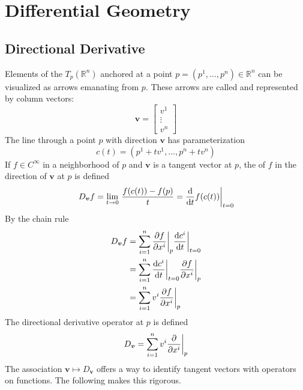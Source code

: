 


\newcommand{\gln}{\operatorname{GL}(n, \R)}
\newcommand{\Rnn}{\R^{n \times n}}
\section{Differential Geometry}\label{sec:dg}
\localtableofcontents

\subsection{Directional Derivative}

Elements of the  \(T_p (\mathbb{R}^n)\) anchored at a point \(p = (p^1, \dots, p^n) \in \mathbb{R}^n\) can be visualized as arrows emanating from \(p\).
%
These arrows are called  and represented by column vectors:
%
\begin{equation}
    \bm{v}
    =
    \begin{bmatrix}
        v^1 \\ \vdots \\ v^n
    \end{bmatrix}
\end{equation}
%
The line through a point \(p\) with direction \(\bm{v}\) has parameterization
%
\begin{equation}
    c(t) = \left( p^1 + t v^1, \dots, p^n + t v^n \right)
\end{equation}
%
If \(f \in C^\infty\) in a neighborhood of \(p\) and \(\bm{v}\) is a tangent vector at \(p\), the  of \(f\) in the direction of \(\bm{v}\) at \(p\) is defined
%
\begin{equation}
    D_{\bm{v}} f
    =
    \lim_{t\rightarrow 0}\, \frac{f(c(t)) - f(p)}{t}
    =
    \evalat[\bigg]{\dv{}{t} f(c(t))}{t=0}
\end{equation}
%
By the chain rule
%
\begin{align}
    D_{\bm{v}} f & = \sum_{i=1}^{n} \evalat[\bigg]{\pdv{f}{x^i}}{p} \evalat[\bigg]{\dv{c^i}{t}}{t=0} \\
                 & = \sum_{i=1}^{n} \evalat[\bigg]{\dv{c^i}{t}}{t=0} \evalat[\bigg]{\pdv{f}{x^i}}{p} \\
                 & = \sum_{i=1}^{n} v^i \evalat[\bigg]{\pdv{f}{x^i}}{p}\label{eqn:chainrule}         \\
\end{align}
%
The directional derivative operator at \(p\) is defined
%
\begin{equation}
    D_{\bm{v}} = \sum_{i=1}^{n} v^i \evalat[\bigg]{\pdv{}{x^i}}{p}
\end{equation}
%
The association \(\bm{v} \mapsto D_{\bm{v}}\) offers a way to  identify tangent vectors with operators on functions.
%
The following makes this rigorous.

